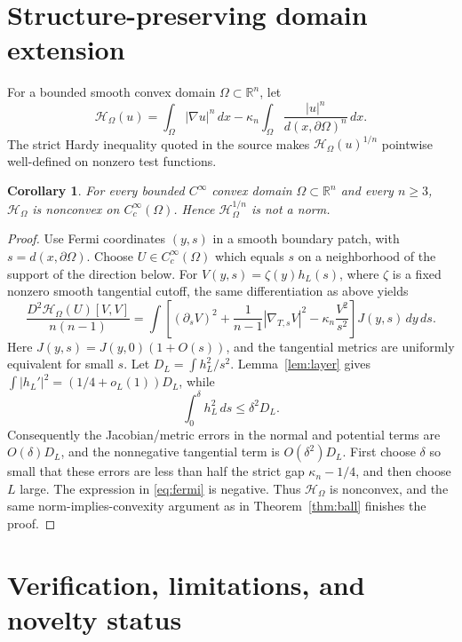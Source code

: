 \documentclass[11pt]{article}
\newtheorem{corollary}{Corollary}
\newcommand{\R}{\mathbb R}
\newcommand{\Cc}{C_c^\infty}
\newcommand{\HH}{\mathcal H}
\newcommand{\kap}{\kappa_n}
\begin{document}
\section{Structure-preserving domain extension}

For a bounded smooth convex domain $\Omega\subset\R^n$, let
\begin{equation}\label{eq:domain}
 \HH_\Omega(u)=\int_\Omega|\nabla u|^n\,dx
 -\kap\int_\Omega\frac{|u|^n}{d(x,\partial\Omega)^n}\,dx.
\end{equation}
The strict Hardy inequality quoted in the source makes
$\HH_\Omega(u)^{1/n}$ pointwise well-defined on nonzero test functions.

\begin{corollary}\label{cor:domain}
For every bounded $C^\infty$ convex domain $\Omega\subset\R^n$ and every
$n\ge3$, $\HH_\Omega$ is nonconvex on $\Cc(\Omega)$.  Hence
$\HH_\Omega^{1/n}$ is not a norm.
\end{corollary}

\begin{proof}
Use Fermi coordinates $(y,s)$ in a smooth boundary patch, with
$s=d(x,\partial\Omega)$.  Choose $U\in\Cc(\Omega)$ which equals $s$ on a
neighborhood of the support of the direction below.  For
$V(y,s)=\zeta(y)h_L(s)$, where $\zeta$ is a fixed nonzero smooth tangential
cutoff, the same differentiation as above yields
\begin{equation}\label{eq:fermi}
 \frac{D^2\HH_\Omega(U)[V,V]}{n(n-1)}
 =\int\left[(\partial_sV)^2+\frac1{n-1}|\nabla_{\!T,s}V|^2
 -\kap\frac{V^2}{s^2}\right]J(y,s)\,dy\,ds.
\end{equation}
Here $J(y,s)=J(y,0)(1+O(s))$, and the tangential metrics are uniformly
equivalent for small $s$.  Let
$D_L=\int h_L^2/s^2$.  Lemma~\ref{lem:layer} gives
$\int|h_L'|^2=(1/4+o_L(1))D_L$, while
\[
 \int_0^\delta h_L^2\,ds\le\delta^2D_L.
\]
Consequently the Jacobian/metric errors in the normal and potential terms are
$O(\delta)D_L$, and the nonnegative tangential term is
$O(\delta^2)D_L$.  First choose $\delta$ so small that these errors are less
than half the strict gap $\kap-1/4$, and then choose $L$ large.  The expression
in \eqref{eq:fermi} is negative.  Thus $\HH_\Omega$ is nonconvex, and the
same norm-implies-convexity argument as in Theorem~\ref{thm:ball} finishes the
proof.
\end{proof}

\section{Verification, limitations, and novelty status}
\end{document}
